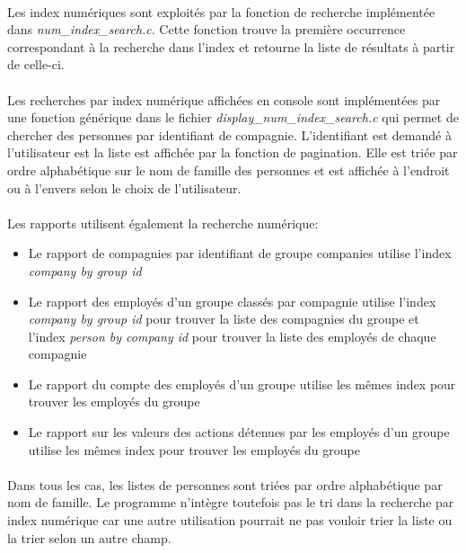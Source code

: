 \documentclass{article}
\begin{document}
    \paragraph{}
    Les index numériques sont exploités par la fonction de recherche implémentée dans \emph{num\_index\_search.c}. Cette fonction trouve la première occurrence correspondant à la recherche dans l'index et retourne la liste de résultats à partir de celle-ci.

    \paragraph{}
    Les recherches par index numérique affichées en console sont implémentées par une fonction générique dans le fichier \emph{display\_num\_index\_search.c} qui permet de chercher des personnes par identifiant de compagnie. L'identifiant est demandé à l'utilisateur est la liste est affichée par la fonction de pagination. Elle est triée par ordre alphabétique sur le nom de famille des personnes et est affichée à l'endroit ou à l'envers selon le choix de l'utilisateur.

    \paragraph{}
    Les rapports utilisent également la recherche numérique:
    \begin{itemize}[label=$\bullet$]
        \item Le rapport de compagnies par identifiant de groupe companies utilise l'index \emph{company by group id}
        \item Le rapport des employés d'un groupe classés par compagnie utilise l'index \emph{company by group id} pour trouver la liste des compagnies du groupe et l'index \emph{person by company id} pour trouver la liste des employés de chaque compagnie
        \item Le rapport du compte des employés d'un groupe utilise les mêmes index pour trouver les employés du groupe
        \item Le rapport sur les valeurs des actions détenues par les employés d'un groupe utilise les mêmes index pour trouver les employés du groupe
    \end{itemize}

    \paragraph{}
    Dans tous les cas, les listes de personnes sont triées par ordre alphabétique par nom de famille. Le programme n'intègre toutefois pas le tri dans la recherche par index numérique car une autre utilisation pourrait ne pas vouloir trier la liste ou la trier selon un autre champ.
    
\end{document}
